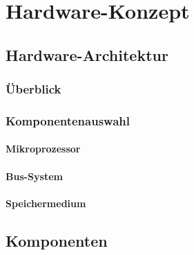 %
%

\chapter{Hardware-Konzept}\label{chap.hardware}



\section{Hardware-Architektur}\label{sec.hw_arch}


\subsection{Überblick}

\subsection{Komponentenauswahl}

\subsubsection{Mikroprozessor}

\subsubsection{Bus-System}

\subsubsection{Speichermedium}


\section{Komponenten}

